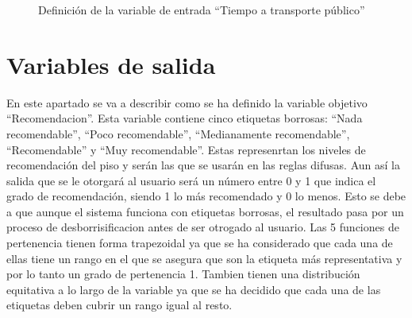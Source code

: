 \documentclass[12pt]{report} %
\begin{document}
        \begin{figure}[H]
            \centering
            \caption{Definición de la variable de entrada ``Tiempo a transporte público''}
        \end{figure}

    \section{Variables de salida}
    En este apartado se va a describir como se ha definido la variable objetivo
    ``Recomendacion''. Esta variable contiene cinco etiquetas borrosas: ``Nada
    recomendable'', ``Poco recomendable'', ``Medianamente recomendable'',
    ``Recomendable'' y ``Muy recomendable''. Estas represenrtan los niveles de
    recomendación del piso y serán las que se usarán en las reglas difusas. Aun
    así la salida que se le otorgará al usuario será un número entre 0 y 1 que
    indica el grado de recomendación, siendo 1 lo más recomendado y 0 lo menos.
    Esto se debe a que aunque el sistema funciona con etiquetas borrosas, el
    resultado pasa por un proceso de desborrisificacion antes de ser otrogado al
    usuario. Las 5 funciones de pertenencia tienen forma trapezoidal ya que se
    ha considerado que cada una de ellas tiene un rango en el que se asegura que
    son la etiqueta más representativa y por lo tanto un grado de pertenencia 1.
    Tambien tienen una distribución equitativa a lo largo de la variable ya que
    se ha decidido que cada una de las etiquetas deben cubrir un rango igual al
    resto.
\end{document}
